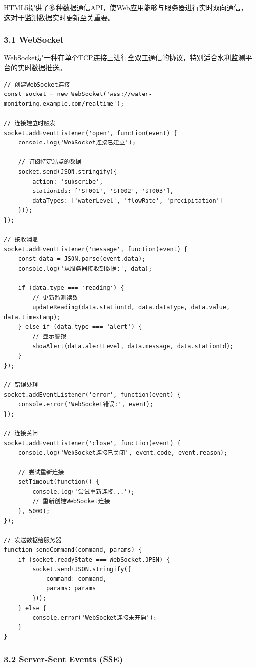 HTML5提供了多种数据通信API，使Web应用能够与服务器进行实时双向通信，这对于监测数据实时更新至关重要。

\subsubsection{3.1 WebSocket}\label{websocket}

WebSocket是一种在单个TCP连接上进行全双工通信的协议，特别适合水利监测平台的实时数据推送。

\begin{lstlisting}
// 创建WebSocket连接
const socket = new WebSocket('wss://water-monitoring.example.com/realtime');

// 连接建立时触发
socket.addEventListener('open', function(event) {
    console.log('WebSocket连接已建立');
    
    // 订阅特定站点的数据
    socket.send(JSON.stringify({
        action: 'subscribe',
        stationIds: ['ST001', 'ST002', 'ST003'],
        dataTypes: ['waterLevel', 'flowRate', 'precipitation']
    }));
});

// 接收消息
socket.addEventListener('message', function(event) {
    const data = JSON.parse(event.data);
    console.log('从服务器接收到数据:', data);
    
    if (data.type === 'reading') {
        // 更新监测读数
        updateReading(data.stationId, data.dataType, data.value, data.timestamp);
    } else if (data.type === 'alert') {
        // 显示警报
        showAlert(data.alertLevel, data.message, data.stationId);
    }
});

// 错误处理
socket.addEventListener('error', function(event) {
    console.error('WebSocket错误:', event);
});

// 连接关闭
socket.addEventListener('close', function(event) {
    console.log('WebSocket连接已关闭', event.code, event.reason);
    
    // 尝试重新连接
    setTimeout(function() {
        console.log('尝试重新连接...');
        // 重新创建WebSocket连接
    }, 5000);
});

// 发送数据给服务器
function sendCommand(command, params) {
    if (socket.readyState === WebSocket.OPEN) {
        socket.send(JSON.stringify({
            command: command,
            params: params
        }));
    } else {
        console.error('WebSocket连接未开启');
    }
}
\end{lstlisting}

\subsubsection{3.2 Server-Sent Events
(SSE)}\label{server-sent-events-sse}

